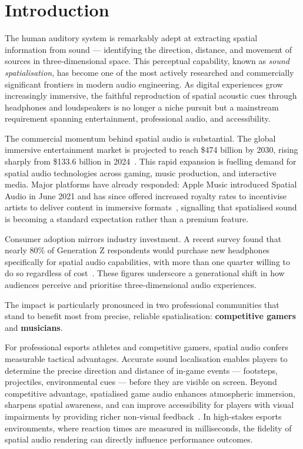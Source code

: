 \section{Introduction}

The human auditory system is remarkably adept at extracting spatial information from sound —
identifying the direction, distance, and movement of sources in three-dimensional space.
This perceptual capability, known as \textit{sound spatialisation}, has become one of the most
actively researched and commercially significant frontiers in modern audio engineering.
As digital experiences grow increasingly immersive, the faithful reproduction of spatial acoustic
cues through headphones and loudspeakers is no longer a niche pursuit but a mainstream
requirement spanning entertainment, professional audio, and accessibility.

The commercial momentum behind spatial audio is substantial. The global immersive entertainment
market is projected to reach \$474 billion by 2030, rising sharply from \$133.6 billion in
2024~\cite{immersive_market_2024}. This rapid expansion is fuelling demand for spatial audio
technologies across gaming, music production, and interactive media. Major platforms have already
responded: Apple Music introduced Spatial Audio in June 2021 and has since offered increased
royalty rates to incentivise artists to deliver content in immersive formats~\cite{apple_spatial_royalties},
signalling that spatialised sound is becoming a standard expectation rather than a premium feature.

Consumer adoption mirrors industry investment. A recent survey found that nearly 80\% of
Generation Z respondents would purchase new headphones specifically for spatial audio
capabilities, with more than one quarter willing to do so regardless of cost~\cite{genz_survey}.
These figures underscore a generational shift in how audiences perceive and prioritise
three-dimensional audio experiences.

The impact is particularly pronounced in two professional communities that stand to benefit most
from precise, reliable spatialisation: \textbf{competitive gamers} and \textbf{musicians}.

For professional esports athletes and competitive gamers, spatial audio confers measurable
tactical advantages. Accurate sound localisation enables players to determine the precise
direction and distance of in-game events — footsteps, projectiles, environmental cues — before
they are visible on screen. Beyond competitive advantage, spatialised game audio enhances
atmospheric immersion, sharpens spatial awareness, and can improve accessibility for players
with visual impairments by providing richer non-visual feedback~\cite{game_audio_benefits}.
In high-stakes esports environments, where reaction times are measured in milliseconds,
the fidelity of spatial audio rendering can directly influence performance outcomes.

